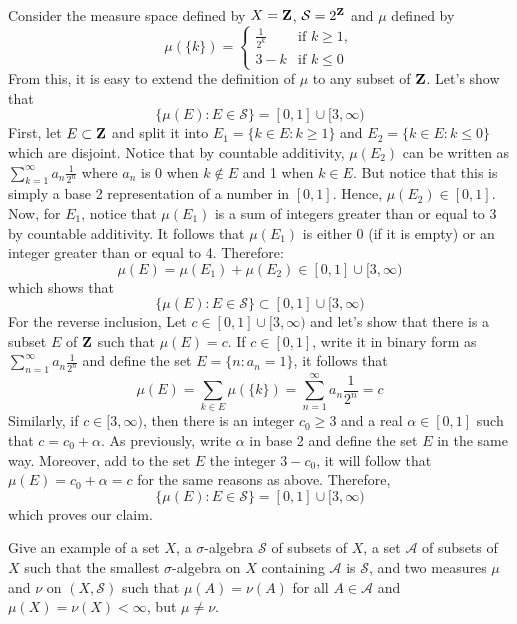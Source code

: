 \begin{solution}
    \\ Consider the measure space defined by $X = \mathbf{Z}$, $\mathcal{S} = 2^{\mathbf{Z}}$ and $\mu$ defined by 
    $$\mu(\{k\}) = \begin{cases}
        \frac{1}{2^k} & \text{if } k \geq 1,\\
        3 - k & \text{if } k\leq 0
    \end{cases}$$
    From this, it is easy to extend the definition of $\mu$ to any subset of $\mathbf{Z}$. Let's show that
    $$\{\mu(E) : E\in\mathcal{S}\} = [0,1] \cup [3, \infty)$$
    First, let $E \subset \mathbf{Z}$ and split it into $E_1 = \{k \in E : k \geq 1\}$ and $E_2 = \{k \in E : k \leq 0\}$ which are disjoint. Notice that by countable additivity, $\mu(E_2)$ can be written as $\sum_{k=1}^{\infty}a_n\frac{1}{2^n}$ where $a_n$ is 0 when $k \notin E$ and 1 when $k \in E$. But notice that this is simply a base 2 representation of a number in $[0, 1]$. Hence, $\mu(E_2) \in [0,1]$. Now, for $E_1$, notice that $\mu(E_1)$ is a sum of integers greater than or equal to 3 by countable additivity. It follows that $\mu(E_1)$ is either 0 (if it is empty) or an integer greater than or equal to 4. Therefore:
    $$\mu(E) = \mu(E_1) + \mu(E_2) \in [0,1] \cup [3, \infty)$$
    which shows that 
    $$\{\mu(E) : E\in\mathcal{S}\} \subset [0,1] \cup [3, \infty)$$
    For the reverse inclusion, Let $c \in [0,1] \cup [3, \infty)$ and let's show that there is a subset $E$ of $\mathbf{Z}$ such that $\mu(E) = c$. If $c \in [0,1]$, write it in binary form as $\sum_{n=1}^{\infty}a_n\frac{1}{2^n}$ and define the set $E = \{n : a_n = 1\}$, it follows that
    $$\mu(E) = \sum_{k \in E} \mu(\{k\}) = \sum_{n=1}^{\infty}a_n\frac{1}{2^n} = c$$
    Similarly, if $c \in [3, \infty)$, then there is an integer $c_0 \geq 3$ and a real $\alpha \in [0,1]$ such that $c = c_0 + \alpha$. As previously, write $\alpha$ in base 2 and define the set $E$ in the same way. Moreover, add to the set $E$ the integer $3 - c_0$, it will follow that $\mu(E) = c_0 + \alpha = c$ for the same reasons as above. Therefore, 
    $$\{\mu(E) : E\in\mathcal{S}\} = [0,1] \cup [3, \infty)$$
    which proves our claim. \\
\end{solution}

\begin{exercise}
    Give an example of a set $X$, a $\sigma$-algebra $\mathcal{S}$ of subsets of $X$, a set $\mathcal{A}$ of subsets of $X$ such that the smallest $\sigma$-algebra on $X$ containing $\mathcal{A}$ is $\mathcal{S}$, and two measures $\mu$ and $\nu$ on $(X, \mathcal{S})$ such that $\mu(A) = \nu(A)$ for all $A \in \mathcal{A}$ and $\mu(X) = \nu(X) < \infty$, but $\mu \neq \nu$. \\
\end{exercise}

